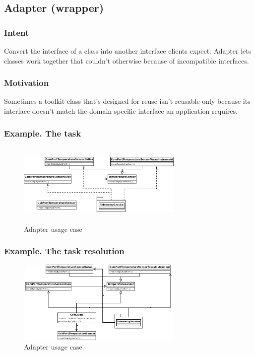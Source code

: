 \documentclass[10pt,xcolor={usenames,dvipsnames}]{beamer}
\begin{document}
\subsection{Adapter (wrapper)}
\begin{frame}[fragile]
	\frametitle{Intent}
	\begin{exampleblock}{}
	Convert the interface of a class into another interface clients expect. Adapter lets
	classes work together that couldn't otherwise because of incompatible interfaces.
	\end{exampleblock}
\end{frame}

\begin{frame}[fragile]
	\frametitle{Motivation}
	\begin{exampleblock}{}
	Sometimes a toolkit class that's designed for reuse isn't reusable only because its
	interface doesn't match the domain-specific interface an application requires.
	\end{exampleblock}
\end{frame}

\begin{frame}[fragile]
	\frametitle{Example. The task}
	\begin{figure}
		\includegraphics[height=4cm,width=8cm]{adapter-task.png}
		\caption{Adapter usage case}
	\end{figure}
\end{frame}

\begin{frame}[fragile]
	\frametitle{Example. The task resolution}
	\begin{figure}
		\includegraphics[height=4cm,width=8cm]{adapter-task-resolution1.png}
		\caption{Adapter usage case}
	\end{figure}
\end{frame}
\end{document}
